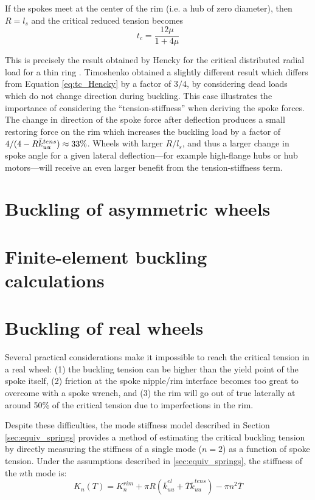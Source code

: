 \documentclass[\rootdir/thesis.tex]{subfiles}
\begin{document}
If the spokes meet at the center of the rim (i.e. a hub of zero diameter), then $R=l_s$ and the critical reduced tension becomes
\begin{equation}
\label{eq:tc_Hencky}
t_c = \frac{12\mu}{1 + 4\mu}
\end{equation}

This is precisely the result obtained by Hencky for the critical distributed radial load for a thin ring \cite{Timoshenko1961}. Timoshenko obtained a slightly different result which differs from Equation \eqref{eq:tc_Hencky} by a factor of  $3/4$, by considering dead loads which do not change direction during buckling. This case illustrates the importance of considering the ``tension-stiffness'' when deriving the spoke forces. The change in direction of the spoke force after deflection produces a small restoring force on the rim which increases the buckling load by a factor of $4/(4 - R\bar{k}_{uu}^{tens}) \approx 33\%$. Wheels with larger $R/l_s$, and thus a larger change in spoke angle for a given lateral deflection---for example high-flange hubs or hub motors---will receive an even larger benefit from the tension-stiffness term.

\section{Buckling of asymmetric wheels}
\inprogress

\section{Finite-element buckling calculations}
\inprogress

\section{Buckling of real wheels}
\label{sec:K2_tension_buckling}

Several practical considerations make it impossible to reach the critical tension in a real wheel: (1) the buckling tension can be higher than the yield point of the spoke itself, (2) friction at the spoke nipple/rim interface becomes too great to overcome with a spoke wrench, and (3) the rim will go out of true laterally at around 50\% of the critical tension due to imperfections in the rim.

Despite these difficulties, the mode stiffness model described in Section \ref{sec:equiv_springs} provides a method of estimating the critical buckling tension by directly measuring the stiffness of a single mode ($n=2$) as a function of spoke tension. Under the assumptions described in \ref{sec:equiv_springs}, the stiffness of the $n$th mode is:
\begin{equation}
\label{eq:Kn_buckling}
K_n(T) = K_n^{rim} + \pi R (\bar{k}_{uu}^{el} + \bar{T} \bar{k}_{uu}^{tens}) - \pi n^2 \bar{T}
\end{equation}
\end{document}
